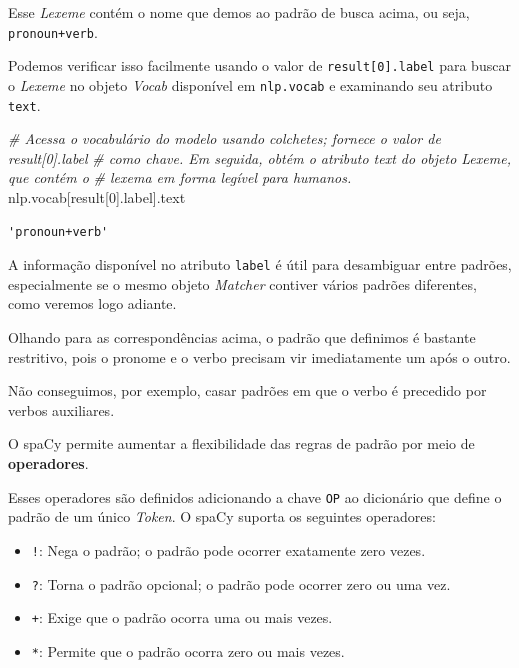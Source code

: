 \documentclass[
  brazilian,
]{article}
\newenvironment{Shaded}{}{}
\newcommand{\CommentTok}[1]{\textcolor[rgb]{0.38,0.63,0.69}{\textit{#1}}}
\newcommand{\DecValTok}[1]{\textcolor[rgb]{0.25,0.63,0.44}{#1}}
\newcommand{\NormalTok}[1]{#1}
\providecommand{\tightlist}{%
  \setlength{\itemsep}{0pt}\setlength{\parskip}{0pt}}
\begin{document}
Esse \emph{Lexeme} contém o nome que demos ao padrão de busca acima, ou
seja, \texttt{pronoun+verb}.

Podemos verificar isso facilmente usando o valor de
\texttt{result{[}0{]}.label} para buscar o \emph{Lexeme} no objeto
\emph{Vocab} disponível em \texttt{nlp.vocab} e examinando seu atributo
\texttt{text}.

\begin{Shaded}
\begin{Highlighting}[]
\CommentTok{\# Acessa o vocabulário do modelo usando colchetes; fornece o valor de \textquotesingle{}result[0].label\textquotesingle{}}
\CommentTok{\# como chave. Em seguida, obtém o atributo \textquotesingle{}text\textquotesingle{} do objeto Lexeme, que contém o}
\CommentTok{\# lexema em forma legível para humanos.}
\NormalTok{nlp.vocab[result[}\DecValTok{0}\NormalTok{].label].text}
\end{Highlighting}
\end{Shaded}

\begin{verbatim}
'pronoun+verb'
\end{verbatim}

A informação disponível no atributo \texttt{label} é útil para
desambiguar entre padrões, especialmente se o mesmo objeto
\emph{Matcher} contiver vários padrões diferentes, como veremos logo
adiante.

Olhando para as correspondências acima, o padrão que definimos é
bastante restritivo, pois o pronome e o verbo precisam vir imediatamente
um após o outro.

Não conseguimos, por exemplo, casar padrões em que o verbo é precedido
por verbos auxiliares.

O spaCy permite aumentar a flexibilidade das regras de padrão por meio
de \textbf{operadores}.

Esses operadores são definidos adicionando a chave \texttt{OP} ao
dicionário que define o padrão de um único \emph{Token}. O spaCy suporta
os seguintes operadores:

\begin{itemize}
\tightlist
\item
  \texttt{!}: Nega o padrão; o padrão pode ocorrer exatamente zero
  vezes.
\item
  \texttt{?}: Torna o padrão opcional; o padrão pode ocorrer zero ou uma
  vez.
\item
  \texttt{+}: Exige que o padrão ocorra uma ou mais vezes.
\item
  \texttt{*}: Permite que o padrão ocorra zero ou mais vezes.
\end{itemize}
\end{document}
